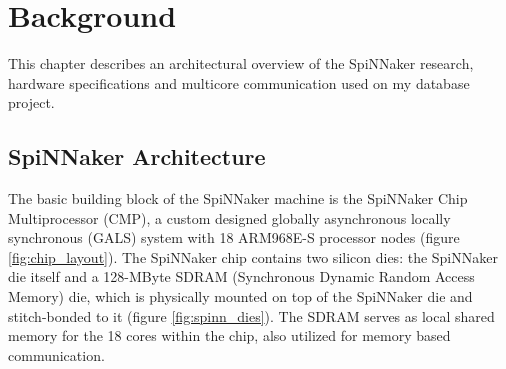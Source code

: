 \chapter{Background}
\label{cha:background}
This chapter describes an architectural overview of the SpiNNaker research, hardware specifications and multicore communication used on my database project.

\section{SpiNNaker Architecture}

The basic building block of the SpiNNaker machine is the SpiNNaker Chip Multiprocessor (CMP), a custom designed globally asynchronous locally synchronous (GALS) system with 18 ARM968E-S processor nodes (figure \ref{fig:chip_layout}). \cite{painkras}
The SpiNNaker chip contains two silicon dies: the SpiNNaker die itself and a 128-MByte SDRAM (Synchronous Dynamic Random Access Memory) die, which is physically mounted on top of the SpiNNaker die and stitch-bonded to it (figure \ref{fig:spinn_dies}). \cite{spinnchip} The SDRAM serves as local shared memory for the 18 cores within the chip, also utilized for memory based communication. \cite{datasheet}

